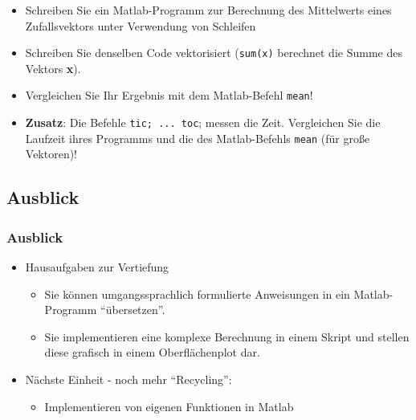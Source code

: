       \secMexercise
      \begin{frame}
          \frameMexercise
          \begin{exercise}
              \sloppy
              \begin{itemize}
                \item Schreiben Sie ein Matlab-Programm zur Berechnung des Mittelwerts eines Zufallsvektors unter Verwendung von Schleifen
                \item Schreiben Sie denselben Code vektorisiert (\texttt{sum(x)} berechnet die Summe des Vektors \textbf{x}).
                \item Vergleichen Sie Ihr Ergebnis mit dem Matlab-Befehl \texttt{mean}!
                \item \textbf{Zusatz}: Die Befehle \texttt{tic; ... toc}; messen die Zeit. Vergleichen Sie die Laufzeit ihres Programms und die des
                Matlab-Befehls \texttt{mean} (für große Vektoren)!
              \end{itemize}
          \end{exercise}
      \end{frame}

      \subsection{Ausblick}
      \begin{frame}
          \frametitle{Ausblick}
          \begin{itemize}
            \item Hausaufgaben zur Vertiefung
            \begin{itemize}
              \item Sie können umgangssprachlich formulierte Anweisungen in ein Matlab-Programm ``übersetzen''.
              \item Sie implementieren eine komplexe Berechnung in einem Skript und stellen diese grafisch in einem Oberflächenplot dar.
            \end{itemize}
            \item Nächste Einheit - noch mehr ``Recycling'':
            \begin{itemize}
              \item Implementieren von eigenen Funktionen in Matlab
            \end{itemize}
          \end{itemize}
      \end{frame}



